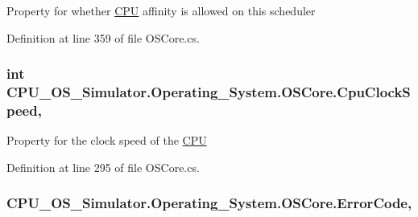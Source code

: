 Property for whether \hyperlink{namespace_c_p_u___o_s___simulator_1_1_c_p_u}{C\+P\+U} affinity is allowed on this scheduler 



Definition at line 359 of file O\+S\+Core.\+cs.

\hypertarget{class_c_p_u___o_s___simulator_1_1_operating___system_1_1_o_s_core_a1ea93a6cc37dbae4bc607d09fd6e75db}{}
\subsubsection[{Cpu\+Clock\+Speed}]{\setlength{\rightskip}{0pt plus 5cm}int C\+P\+U\+\_\+\+O\+S\+\_\+\+Simulator.\+Operating\+\_\+\+System.\+O\+S\+Core.\+Cpu\+Clock\+Speed\hspace{0.3cm}{\ttfamily [get]}, {\ttfamily [set]}}\label{class_c_p_u___o_s___simulator_1_1_operating___system_1_1_o_s_core_a1ea93a6cc37dbae4bc607d09fd6e75db}


Property for the clock speed of the \hyperlink{namespace_c_p_u___o_s___simulator_1_1_c_p_u}{C\+P\+U} 



Definition at line 295 of file O\+S\+Core.\+cs.

\hypertarget{class_c_p_u___o_s___simulator_1_1_operating___system_1_1_o_s_core_a77a647e293c14574919b144cb2e8998f}{}
\subsubsection[{Error\+Code}]{ C\+P\+U\+\_\+\+O\+S\+\_\+\+Simulator.\+Operating\+\_\+\+System.\+O\+S\+Core.\+Error\+Code\hspace{0.3cm}{\ttfamily [get]}, {\ttfamily [set]}}\label{class_c_p_u___o_s___simulator_1_1_operating___system_1_1_o_s_core_a77a647e293c14574919b144cb2e8998f}


